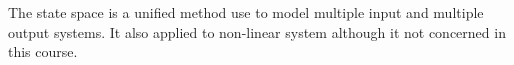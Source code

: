The state space is a unified method use to model multiple input and multiple output systems. It also applied to non-linear system although it not concerned in this course.
